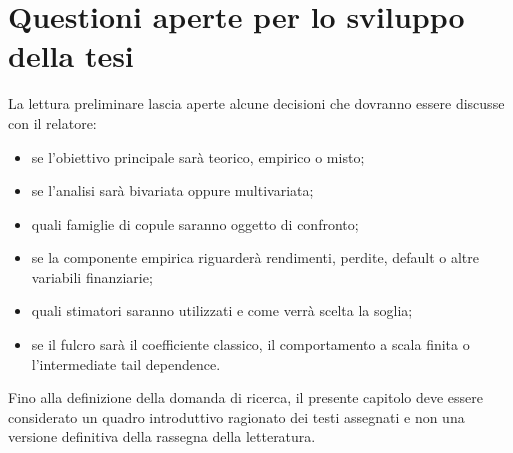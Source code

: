 \section{Questioni aperte per lo sviluppo della tesi}

La lettura preliminare lascia aperte alcune decisioni che dovranno essere
discusse con il relatore:

\begin{itemize}
    \item se l'obiettivo principale sarà teorico, empirico o misto;
    \item se l'analisi sarà bivariata oppure multivariata;
    \item quali famiglie di copule saranno oggetto di confronto;
    \item se la componente empirica riguarderà rendimenti, perdite, default o
          altre variabili finanziarie;
    \item quali stimatori saranno utilizzati e come verrà scelta la soglia;
    \item se il fulcro sarà il coefficiente classico, il comportamento a scala
          finita o l'intermediate tail dependence.
\end{itemize}

Fino alla definizione della domanda di ricerca, il presente capitolo deve
essere considerato un quadro introduttivo ragionato dei testi assegnati e non
una versione definitiva della rassegna della letteratura.
